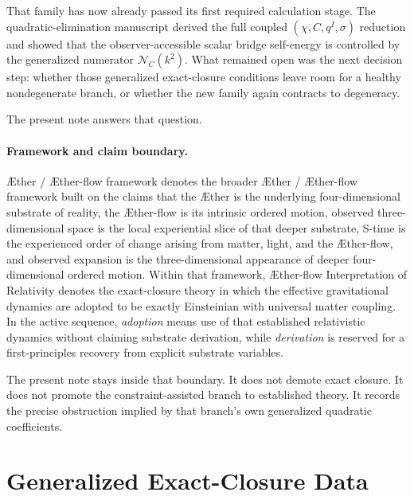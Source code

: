 \documentclass[11pt]{article}
\newcommand{\Aether}{\AE{}ther}
\newcommand{\Aflow}{\AE{}ther-flow}
\newcommand{\TheoryName}{\Aflow{} Interpretation of Relativity}
\newcommand{\TheoryProgram}{\Aether{} / \Aflow{} framework}
\begin{document}
That family has now already passed its first required calculation stage. The quadratic-elimination manuscript derived the full coupled \((\chi,C,q^I,\sigma)\) reduction and showed that the observer-accessible scalar bridge self-energy is controlled by the generalized numerator \(\mathcal N_C(k^2)\). What remained open was the next decision step: whether those generalized exact-closure conditions leave room for a healthy nondegenerate branch, or whether the new family again contracts to degeneracy.

The present note answers that question.

\paragraph{Framework and claim boundary.}
\TheoryProgram{} denotes the broader \Aether{} / \Aflow{} framework built on the claims that the \Aether{} is the underlying four-dimensional substrate of reality, the \Aflow{} is its intrinsic ordered motion, observed three-dimensional space is the local experiential slice of that deeper substrate, S-time is the experienced order of change arising from matter, light, and the \Aflow{}, and observed expansion is the three-dimensional appearance of deeper four-dimensional ordered motion. Within that framework, \TheoryName{} denotes the exact-closure theory in which the effective gravitational dynamics are adopted to be exactly Einsteinian with universal matter coupling. In the active sequence, \emph{adoption} means use of that established relativistic dynamics without claiming substrate derivation, while \emph{derivation} is reserved for a first-principles recovery from explicit substrate variables.

The present note stays inside that boundary. It does not demote exact closure. It does not promote the constraint-assisted branch to established theory. It records the precise obstruction implied by that branch's own generalized quadratic coefficients.

\section{Generalized Exact-Closure Data}
\end{document}
